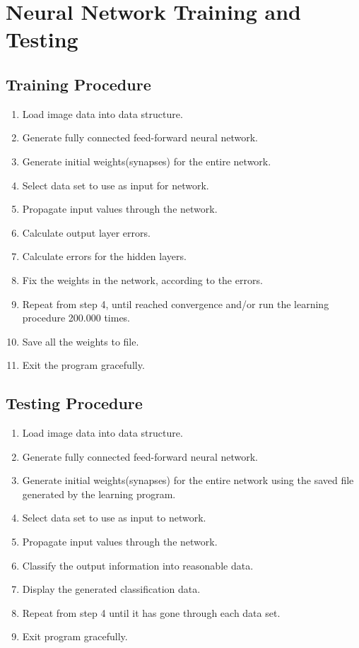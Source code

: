 \chapter{Neural Network Training and Testing}
\section{Training Procedure}
\begin{enumerate}
\item Load image data into data structure.
\item Generate fully connected feed-forward neural network.
\item Generate initial weights(synapses) for the entire network.
\item Select data set to use as input for network.
\item Propagate input values through the network.
\item Calculate output layer errors.
\item Calculate errors for the hidden layers.
\item Fix the weights in the network, according to the errors.
\item Repeat from step 4, until reached convergence and/or run the learning
	procedure 200.000 times.
\item Save all the weights to file.
\item Exit the program gracefully.
\end{enumerate}




\section{Testing Procedure}
\begin{enumerate}
\item Load image data into data structure.
\item Generate fully connected feed-forward neural network.
\item Generate initial weights(synapses) for the entire network using the saved
	file generated by the learning program.
\item Select data set to use as input to network.
\item Propagate input values through the network.
\item Classify the output information into reasonable data.
\item Display the generated classification data.
\item Repeat from step 4 until it has gone through each data set.
\item Exit program gracefully.
\end{enumerate}




